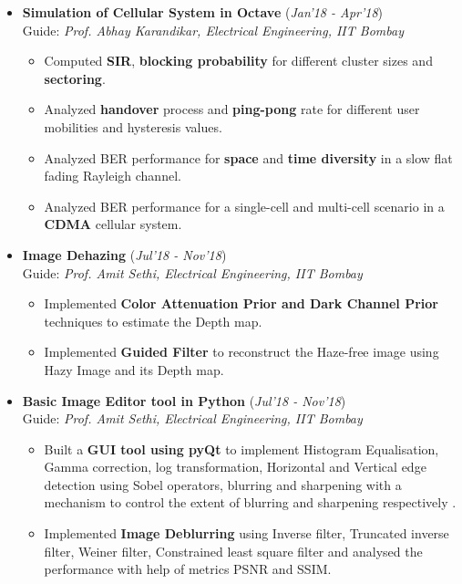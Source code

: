 \documentclass[10pt]{article}
\begin{document}
\begin{itemize}[leftmargin=0.4cm]
\item \textbf{Simulation of Cellular System in Octave}
\hfill{(\textit{Jan'18 - Apr'18})}\\
Guide: \textit{Prof. Abhay Karandikar, Electrical Engineering, IIT Bombay}
	\begin{itemize}
	\item Computed \textbf{SIR}, \textbf{blocking probability} for different cluster sizes and \textbf{sectoring}.
	\item Analyzed \textbf{handover} process and \textbf{ping-pong} rate for different user mobilities and hysteresis values.
	\item Analyzed BER performance for \textbf{space} and \textbf{time diversity} in a slow flat fading Rayleigh channel.
	\item Analyzed BER performance for a single-cell and multi-cell scenario in a \textbf{CDMA} cellular system.
    \end{itemize}

		
	



\item \textbf{Image Dehazing  } \hfill{(\textit{Jul'18 - Nov'18})}\\
Guide: \textit{Prof. Amit Sethi, Electrical Engineering, IIT Bombay}
	\begin{itemize}
	\item Implemented \textbf{Color Attenuation Prior and Dark Channel Prior} techniques to estimate the Depth map.
	\item Implemented \textbf{Guided Filter} to reconstruct the Haze-free image using Hazy Image and its Depth map.
	\end{itemize}
	

\item \textbf{Basic Image Editor tool in Python 
} 
\hfill{(\textit{Jul'18 - Nov'18})}\\
Guide: \textit{Prof. Amit Sethi, Electrical Engineering, IIT Bombay}
	\begin{itemize}
	\item Built a \textbf{GUI tool using pyQt} to implement Histogram Equalisation, Gamma correction, log transformation, Horizontal and Vertical edge detection using Sobel operators, blurring and sharpening with a mechanism to control the extent of blurring and sharpening respectively .
	\item Implemented \textbf{Image Deblurring} using Inverse filter, Truncated inverse filter, Weiner filter, Constrained least square filter and analysed the performance with help of metrics PSNR and SSIM.
	\end{itemize}



\end{itemize}
\end{document}
